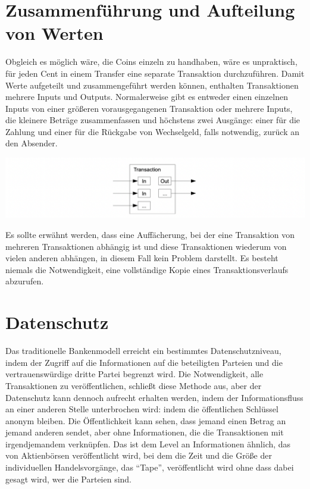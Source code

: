 \documentclass[10pt]{article}
\begin{document}
	\section{Zusammenführung und Aufteilung von Werten}
	
	Obgleich es möglich wäre, die Coins einzeln zu handhaben, wäre es unpraktisch, für jeden Cent in einem Transfer eine separate Transaktion durchzuführen. Damit Werte aufgeteilt und zusammengeführt werden können, enthalten Transaktionen mehrere Inputs und Outputs. Normalerweise gibt es entweder einen einzelnen Inputs von einer größeren vorausgegangenen Transaktion oder mehrere Inputs, die kleinere Beträge zusammenfassen und höchstens zwei Ausgänge: einer für die Zahlung und einer für die Rückgabe von Wechselgeld, falls notwendig, zurück an den Absender.
	
	\begin{center}
		\includegraphics[scale=0.4]{pics/combineandsplit.png}
	\end{center}
	
	Es sollte erwähnt werden, dass eine Auffächerung, bei der eine Transaktion von mehreren Transaktionen abhängig ist und diese Transaktionen wiederum von vielen anderen abhängen, in diesem Fall kein Problem darstellt. Es besteht niemals die Notwendigkeit, eine vollständige Kopie eines Transaktionsverlaufs abzurufen.
	
	\newpage
	
	\section{Datenschutz}
	
	Das traditionelle Bankenmodell erreicht ein bestimmtes Datenschutzniveau, indem der Zugriff auf die Informationen auf die beteiligten Parteien und die vertrauenswürdige dritte Partei begrenzt wird. Die Notwendigkeit, alle Transaktionen zu veröffentlichen, schließt diese Methode aus, aber der Datenschutz kann dennoch aufrecht erhalten werden, indem der Informationsfluss an einer anderen Stelle unterbrochen wird: indem die öffentlichen Schlüssel anonym bleiben. Die Öffentlichkeit kann sehen, dass jemand einen Betrag an jemand anderen sendet, aber ohne Informationen, die die Transaktionen mit irgendjemandem verknüpfen. Das ist dem Level an Informationen ähnlich, das von Aktienbörsen veröffentlicht wird, bei dem die Zeit und die Größe der individuellen Handelsvorgänge, das “Tape”, veröffentlicht wird ohne dass dabei gesagt wird, wer die Parteien sind.
	
\end{document}
